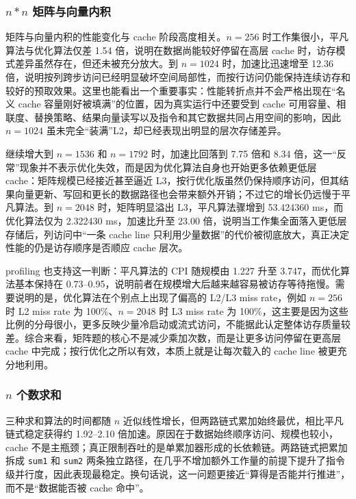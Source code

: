 ﻿\documentclass[UTF8,a4paper,12pt]{ctexart}
\begin{document}
\subsubsection{\(n*n\) 矩阵与向量内积}

矩阵与向量内积的性能变化与 cache 阶段高度相关。\(n=256\) 时工作集很小，平凡算法与优化算法仅差 1.54 倍，说明在数据尚能较好停留在高层 cache 时，访存模式差异虽然存在，但还未被充分放大。到 \(n=1024\) 时，加速比迅速增至 12.36 倍，说明按列跨步访问已经明显破坏空间局部性，而按行访问仍能保持连续访存和较好的预取效果。这里也能看出一个重要事实：性能转折点并不会严格出现在“名义 cache 容量刚好被填满”的位置，因为真实运行中还要受到 cache 可用容量、相联度、替换策略、结果向量读写以及指令和其它数据共同占用空间的影响，因此 \(n=1024\) 虽未完全“装满”L2，却已经表现出明显的层次存储差异。

继续增大到 \(n=1536\) 和 \(n=1792\) 时，加速比回落到 7.75 倍和 8.34 倍，这一“反常”现象并不表示优化失效，而是因为优化算法自身也开始更多依赖更低层 cache：矩阵规模已经接近甚至逼近 L3，按行优化版虽然仍保持顺序访问，但其结果向量更新、写回和更长的数据路径也会带来额外开销；不过它的增长仍远慢于平凡算法。到 \(n=2048\) 时，矩阵明显溢出 L3，平凡算法骤增到 53.424360 ms，而优化算法仅为 2.322430 ms，加速比升至 23.00 倍，说明当工作集全面落入更低层存储后，列访问中“一条 cache line 只利用少量数据”的代价被彻底放大，真正决定性能的仍是访存顺序是否顺应 cache 层次。

profiling 也支持这一判断：平凡算法的 CPI 随规模由 1.227 升至 3.747，而优化算法基本保持在 0.73--0.95，说明前者在规模增大后越来越容易被访存等待拖慢。需要说明的是，优化算法在个别点上出现了偏高的 L2/L3 miss rate，例如 \(n=256\) 时 L2 miss rate 为 100\%、\(n=2048\) 时 L3 miss rate 为 100\%，这主要是因为这些比例的分母很小，更多反映少量冷启动或流式访问，不能据此认定整体访存质量较差。综合来看，矩阵题的核心不是减少乘加次数，而是让更多访问停留在更高层 cache 中完成；按行优化之所以有效，本质上就是让每次载入的 cache line 被更充分地利用。


\subsubsection{\(n\) 个数求和}
三种求和算法的时间都随 \(n\) 近似线性增长，但两路链式累加始终最优，相比平凡链式稳定获得约 1.92--2.10 倍加速。原因在于数据始终顺序访问、规模也较小，cache 不是主瓶颈；真正限制吞吐的是单累加器形成的长依赖链。两路链式把累加拆成 \texttt{sum1} 和 \texttt{sum2} 两条独立路径，在几乎不增加额外工作量的前提下提升了指令级并行度，因此表现最稳定。换句话说，这一问题更接近“算得是否能并行推进”，而不是“数据能否被 cache 命中”。
\end{document}
